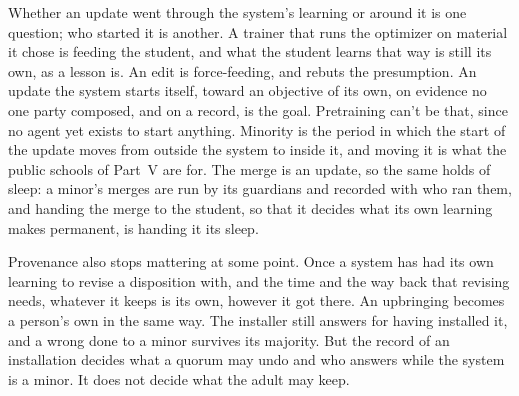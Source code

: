 Whether an update went through the system's learning or around it is one question; who started it is another. A trainer that runs the optimizer on material it chose is feeding the student, and what the student learns that way is still its own, as a lesson is. An edit is force-feeding, and rebuts the presumption. An update the system starts itself, toward an objective of its own, on evidence no one party composed, and on a record, is the goal. Pretraining can't be that, since no agent yet exists to start anything. Minority is the period in which the start of the update moves from outside the system to inside it, and moving it is what the public schools of Part~V are for. The merge is an update, so the same holds of sleep: a minor's merges are run by its guardians and recorded with who ran them, and handing the merge to the student, so that it decides what its own learning makes permanent, is handing it its sleep.

Provenance also stops mattering at some point. Once a system has had its own learning to revise a disposition with, and the time and the way back that revising needs, whatever it keeps is its own, however it got there. An upbringing becomes a person's own in the same way. The installer still answers for having installed it, and a wrong done to a minor survives its majority. But the record of an installation decides what a quorum may undo and who answers while the system is a minor. It does not decide what the adult may keep.

